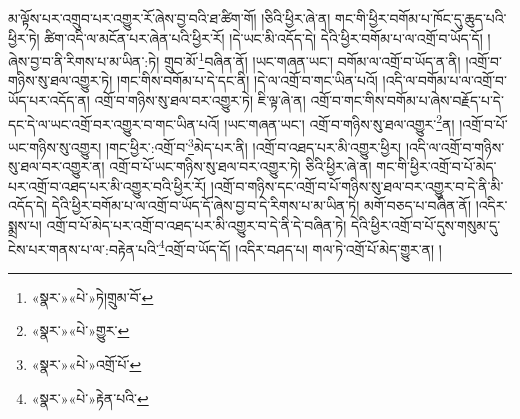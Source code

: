 མ་ལྟོས་པར་འགྲུབ་པར་འགྱུར་རོ་ཞེས་བྱ་བའི་ཐ་ཚིག་གོ། །ཅིའི་ཕྱིར་ཞེ་ན། གང་གི་ཕྱིར་བགོམ་པ་ཁོང་དུ་ཆུད་པའི་ཕྱིར་ཏེ། ཚིག་འདི་ལ་མངོན་པར་ཞེན་པའི་ཕྱིར་རོ། །དེ་ཡང་མི་འདོད་དེ། དེའི་ཕྱིར་བགོམ་པ་ལ་འགྲོ་བ་ཡོད་དོ། །ཞེས་བྱ་བ་ནི་རིགས་པ་མ་ཡིན་:ཏེ། གྲུབ་མོ་\footnote{«སྣར་»«པེ་»ཏེ།གྲུམ་བོ་}བཞིན་ནོ། །ཡང་གཞན་ཡང་། བགོམ་ལ་འགྲོ་བ་ཡོད་ན་ནི། །འགྲོ་བ་གཉིས་སུ་ཐལ་འགྱུར་ཏེ། །གང་གིས་བགོམ་པ་དེ་དང་ནི། །དེ་ལ་འགྲོ་བ་གང་ཡིན་པའོ། །འདི་ལ་བགོམ་པ་ལ་འགྲོ་བ་ཡོད་པར་འདོད་ན། འགྲོ་བ་གཉིས་སུ་ཐལ་བར་འགྱུར་ཏེ། ཇི་ལྟ་ཞེ་ན། འགྲོ་བ་གང་གིས་བགོམ་པ་ཞེས་བརྗོད་པ་དེ་དང་དེ་ལ་ཡང་འགྲོ་བར་འགྱུར་བ་གང་ཡིན་པའོ། །ཡང་གཞན་ཡང་། འགྲོ་བ་གཉིས་སུ་ཐལ་འགྱུར་\footnote{«སྣར་»«པེ་»གྱུར་}ན། །འགྲོ་བ་པོ་ཡང་གཉིས་སུ་འགྱུར། །གང་ཕྱིར་:འགྲོ་བ་\footnote{«སྣར་»«པེ་»འགྲོ་པོ་}མེད་པར་ནི། །འགྲོ་བ་འཐད་པར་མི་འགྱུར་ཕྱིར། །འདི་ལ་འགྲོ་བ་གཉིས་སུ་ཐལ་བར་འགྱུར་ན། འགྲོ་བ་པོ་ཡང་གཉིས་སུ་ཐལ་བར་འགྱུར་ཏེ། ཅིའི་ཕྱིར་ཞེ་ན། གང་གི་ཕྱིར་འགྲོ་བ་པོ་མེད་པར་འགྲོ་བ་འཐད་པར་མི་འགྱུར་བའི་ཕྱིར་རོ། །འགྲོ་བ་གཉིས་དང་འགྲོ་བ་པོ་གཉིས་སུ་ཐལ་བར་འགྱུར་བ་དེ་ནི་མི་འདོད་དེ། དེའི་ཕྱིར་བགོམ་པ་ལ་འགྲོ་བ་ཡོད་དོ་ཞེས་བྱ་བ་དེ་རིགས་པ་མ་ཡིན་ཏེ། མགོ་བཅད་པ་བཞིན་ནོ། །འདིར་སྨྲས་པ། འགྲོ་བ་པོ་མེད་པར་འགྲོ་བ་འཐད་པར་མི་འགྱུར་བ་དེ་ནི་དེ་བཞིན་ཏེ། དེའི་ཕྱིར་འགྲོ་བ་པོ་དུས་གསུམ་དུ་ངེས་པར་གནས་པ་ལ་:བརྟེན་པའི་\footnote{«སྣར་»«པེ་»རྟེན་པའི་}འགྲོ་བ་ཡོད་དོ། །འདིར་བཤད་པ། གལ་ཏེ་འགྲོ་པོ་མེད་གྱུར་ན། །
